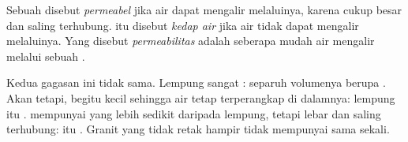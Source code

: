 \begin{definition}[Permeabilitas]\label{def:g6:water-underground:permeability}
Sebuah  disebut \emph{permeabel} jika air dapat
mengalir melaluinya, karena  cukup besar dan saling terhubung.
 itu disebut \emph{kedap air} jika air tidak dapat
mengalir melaluinya. Yang disebut
\emph{permeabilitas} adalah seberapa mudah air mengalir
melalui sebuah .
\end{definition}

Kedua gagasan ini tidak sama. Lempung sangat : separuh volumenya
berupa . Akan tetapi,  begitu kecil sehingga air tetap
terperangkap di dalamnya: lempung itu \emph{}.  mempunyai 
yang lebih sedikit daripada lempung, tetapi  lebar dan saling
terhubung:  itu \emph{}. Granit yang tidak retak hampir tidak
mempunyai  sama sekali.

